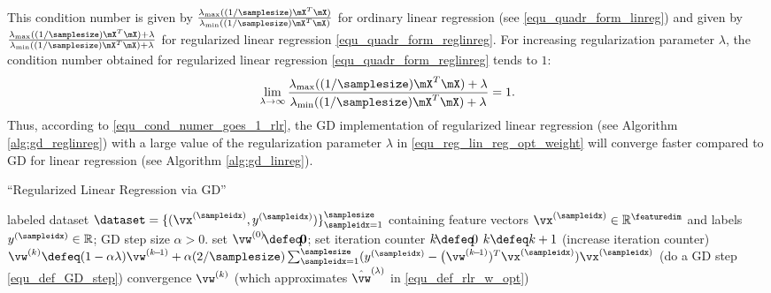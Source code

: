 \documentclass[12pt]{report}
\begin{document}
This condition number is given by $\frac{\lambda_{\rm max}((1/\samplesize) \mX^{T} \mX)} {\lambda_{\rm min}((1/\samplesize) \mX^{T} \mX)}$ for ordinary linear regression 
(see \eqref{equ_quadr_form_linreg}) and given by $\frac{\lambda_{\rm max}((1/\samplesize)\mX^{T} \mX) + \lambda} {\lambda_{\rm min}((1/\samplesize)\mX^{T} \mX)+ \lambda}$ 
for regularized linear regression \eqref{equ_quadr_form_reglinreg}. For increasing 
regularization parameter $\lambda$, the condition number obtained for regularized 
linear regression \eqref{equ_quadr_form_reglinreg} tends to $1$: 
\begin{equation}
\label{equ_cond_numer_goes_1_rlr}
\lim_{\lambda \rightarrow \infty} \frac{\lambda_{\rm max}((1/\samplesize)\mX^{T} \mX) + \lambda} {\lambda_{\rm min}((1/\samplesize)\mX^{T} \mX)+ \lambda} =1. 
\end{equation} 
Thus, according to \eqref{equ_cond_numer_goes_1_rlr}, the GD 
implementation of regularized linear regression (see Algorithm \ref{alg:gd_reglinreg}) 
with a large value of the regularization parameter $\lambda$ 
in \eqref{equ_reg_lin_reg_opt_weight} will converge faster compared 
to GD for linear regression (see Algorithm \ref{alg:gd_linreg}). 


\begin{algorithm}[htbp]
\caption{``Regularized Linear Regression via GD''}\label{alg:gd_reglinreg}
\begin{algorithmic}[1]
\renewcommand{\algorithmicrequire}{\textbf{Input:}}
\renewcommand{\algorithmicensure}{\textbf{Output:}}
\Require   labeled dataset $\dataset=\{ (\vx^{(\sampleidx)}, y^{(\sampleidx)}) \}_{\sampleidx=1}^{\samplesize}$ containing feature vectors 
$\vx^{(\sampleidx)} \in \mathbb{R}^{\featuredim}$ and labels $y^{(\sampleidx)} \in \mathbb{R}$; GD step size $\alpha >0$. 
\Statex\hspace{-6mm}{\bf Initialize:}set $\vw^{(0)}\!\defeq\!\mathbf{0}$; set iteration counter $k\!\defeq\!0$   
\Repeat 
\State $k \defeq k +1$    (increase iteration counter) 
\State  $\vw^{(k)} \defeq (1- \alpha \lambda) \vw^{(k\!-\!1)} + \alpha (2/\samplesize) \sum_{\sampleidx=1}^{\samplesize} (y^{(\sampleidx)} - \big(\vw^{(k\!-\!1)})^{T} \vx^{(\sampleidx)}) \vx^{(\sampleidx)}$  (do a GD step \eqref{equ_def_GD_step})
\Until convergence 
\Ensure $\vw^{(k)}$ (which approximates $\hat{\vw}^{(\lambda)}$ in \eqref{equ_def_rlr_w_opt})
\end{algorithmic}
\end{algorithm}
\end{document}
